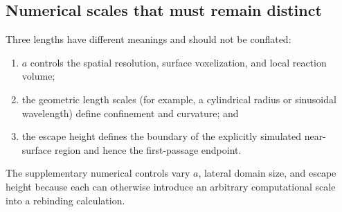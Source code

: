 \subsection{Numerical scales that must remain distinct}

Three lengths have different meanings and should not be conflated:
\begin{enumerate}[leftmargin=*]
 \item $a$ controls the spatial resolution, surface voxelization, and local
 reaction volume;
 \item the geometric length scales (for example, a cylindrical radius or
 sinusoidal wavelength) define confinement and curvature; and
 \item the escape height defines the boundary of the explicitly simulated
 near-surface region and hence the first-passage endpoint.
\end{enumerate}
The supplementary numerical controls vary $a$, lateral domain size, and
escape height because each can otherwise introduce an arbitrary computational
scale into a rebinding calculation.
